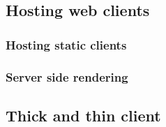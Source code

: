 \subsection{Hosting web clients}

\subsubsection{Hosting static clients}

\subsubsection{Server side rendering}


\subsection{Thick and thin client}



